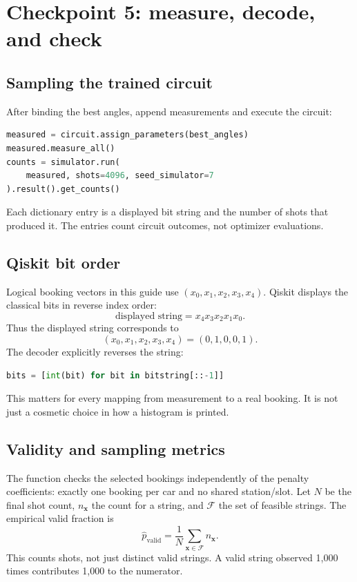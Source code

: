 \section{Checkpoint 5: measure, decode, and check}
\subsection{Sampling the trained circuit}
After binding the best angles, append measurements and execute the circuit:
\begin{lstlisting}[language=Python]
measured = circuit.assign_parameters(best_angles)
measured.measure_all()
counts = simulator.run(
    measured, shots=4096, seed_simulator=7
).result().get_counts()
\end{lstlisting}
Each dictionary entry is a displayed bit string and the number of shots that
produced it. The entries count circuit outcomes, not optimizer evaluations.

\subsection{Qiskit bit order}
Logical booking vectors in this guide use $(x_0,x_1,x_2,x_3,x_4)$. Qiskit displays
the classical bits in reverse index order:
\begin{equation}
\text{displayed string}=x_4x_3x_2x_1x_0.
\end{equation}
Thus the displayed string  corresponds to
\begin{equation}
(x_0,x_1,x_2,x_3,x_4)=(0,1,0,0,1).
\end{equation}
The decoder explicitly reverses the string:
\begin{lstlisting}[language=Python]
bits = [int(bit) for bit in bitstring[::-1]]
\end{lstlisting}
This matters for every mapping from measurement to a real booking. It is not
just a cosmetic choice in how a histogram is printed.

\subsection{Validity and sampling metrics}
The function  checks the selected bookings independently of
the penalty coefficients: exactly one booking per car and no shared station/slot.
Let $N$ be the final shot count, $n_{\boldsymbol{x}}$ the count for a string, and
$\mathcal F$ the set of feasible strings. The empirical valid fraction is
\begin{equation}\label{eq:valid-rate}
\widehat p_{\mathrm{valid}}=\frac1N
\sum_{\boldsymbol{x}\in\mathcal F}n_{\boldsymbol{x}}.
\end{equation}
This counts shots, not just distinct valid strings. A valid string observed
1,000 times contributes 1,000 to the numerator.

